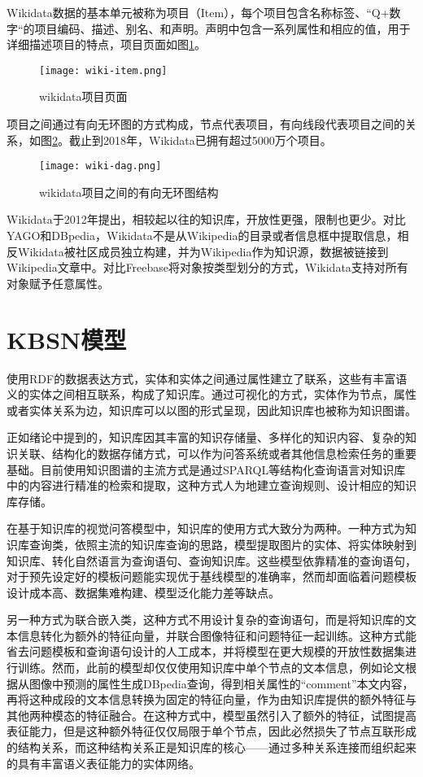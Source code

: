 Wikidata数据的基本单元被称为项目（Item），每个项目包含名称标签、“Q+数字“的项目编码、描述、别名、和声明。声明中包含一系列属性和相应的值，用于详细描述项目的特点，项目页面如图\ref{wiki-item}。
\begin{figure}[H]
	\centering
	\texttt{[image: wiki-item.png]}
	\caption{wikidata项目页面}
	\label{wiki-item}
\end{figure}
项目之间通过有向无环图的方式构成，节点代表项目，有向线段代表项目之间的关系，如图\ref{wiki-dag}。截止到2018年，Wikidata已拥有超过5000万个项目。
\begin{figure}[H]
	\centering
	\texttt{[image: wiki-dag.png]}
	\caption{wikidata项目之间的有向无环图结构}
	\label{wiki-dag}
\end{figure}

Wikidata于2012年提出，相较起以往的知识库，开放性更强，限制也更少。对比YAGO和DBpedia，Wikidata不是从Wikipedia的目录或者信息框中提取信息，相反Wikidata被社区成员独立构建，并为Wikipedia作为知识源，数据被链接到Wikipedia文章中。对比Freebase将对象按类型划分的方式，Wikidata支持对所有对象赋予任意属性。

\section{KBSN模型}
使用RDF的数据表达方式，实体和实体之间通过属性建立了联系，这些有丰富语义的实体之间相互联系，构成了知识库。通过可视化的方式，实体作为节点，属性或者实体关系为边，知识库可以以图的形式呈现，因此知识库也被称为知识图谱。

正如绪论中提到的，知识库因其丰富的知识存储量、多样化的知识内容、复杂的知识关联、结构化的数据存储方式，可以作为问答系统或者其他信息检索任务的重要基础。目前使用知识图谱的主流方式是通过SPARQL等结构化查询语言对知识库中的内容进行精准的检索和提取，这种方式人为地建立查询规则、设计相应的知识库存储。

在基于知识库的视觉问答模型中，知识库的使用方式大致分为两种。一种方式为知识库查询类，依照主流的知识库查询的思路，模型提取图片的实体、将实体映射到知识库、转化自然语言为查询语句、查询知识库。这些模型依靠精准的查询语句，对于预先设定好的模板问题能实现优于基线模型的准确率，然而却面临着问题模板设计成本高、数据集难构建、模型泛化能力差等缺点。

另一种方式为联合嵌入类，这种方式不用设计复杂的查询语句，而是将知识库的文本信息转化为额外的特征向量，并联合图像特征和问题特征一起训练。这种方式能省去问题模板和查询语句设计的人工成本，并将模型在更大规模的开放性数据集进行训练。然而，此前的模型却仅仅使用知识库中单个节点的文本信息，例如论文根据从图像中预测的属性生成DBpedia查询，得到相关属性的“comment”本文内容，再将这种成段的文本信息转换为固定的特征向量，作为由知识库提供的额外特征与其他两种模态的特征融合。在这种方式中，模型虽然引入了额外的特征，试图提高表征能力，但是这种额外特征仅仅局限于单个节点，因此必然损失了节点互联形成的结构关系，而这种结构关系正是知识库的核心——通过多种关系连接而组织起来的具有丰富语义表征能力的实体网络。

